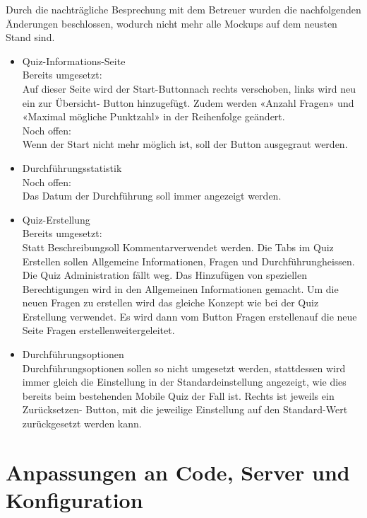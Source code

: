 \documentclass[12pt, a4paper]{report}
\begin{document}
	Durch die nachträgliche Besprechung mit dem Betreuer wurden die nachfolgenden  Änderungen beschlossen, wodurch nicht mehr alle Mockups auf dem neusten Stand sind.
	\begin{itemize}
		\item Quiz-Informations-Seite\\
		Bereits umgesetzt:\\
		Auf dieser Seite wird der \glqq Start-Button\grqq nach rechts verschoben, links wird neu ein \glqq zur Übersicht\grqq - Button hinzugefügt. Zudem werden «Anzahl Fragen» und «Maximal mögliche Punktzahl» in der Reihenfolge geändert.\\
		Noch offen:\\
		Wenn der Start nicht mehr möglich ist, soll der Button ausgegraut werden.
		\item Durchführungsstatistik\\
		Noch offen:\\
		Das Datum der Durchführung soll immer angezeigt werden.
		\item Quiz-Erstellung\\
		Bereits umgesetzt:\\
		Statt \glqq Beschreibung\grqq soll \glqq Kommentar\grqq verwendet werden. Die Tabs im Quiz Erstellen sollen \glqq Allgemeine Informationen, Fragen und Durchführung\grqq heissen. Die Quiz Administration fällt weg. Das Hinzufügen von speziellen Berechtigungen wird in den Allgemeinen Informationen gemacht. Um die neuen Fragen zu erstellen wird das gleiche Konzept wie bei der Quiz Erstellung verwendet. Es wird dann vom Button \glqq Fragen erstellen\grqq auf die neue Seite \glqq Fragen erstellen\grqq weitergeleitet.
		
		\item Durchführungsoptionen\\
		Durchführungsoptionen sollen so nicht umgesetzt werden, stattdessen wird immer gleich die Einstellung in der Standardeinstellung angezeigt, wie dies bereits beim bestehenden Mobile Quiz der Fall ist. Rechts ist jeweils ein \glqq Zurücksetzen\grqq - Button, mit die jeweilige Einstellung auf den Standard-Wert zurückgesetzt werden kann.
		
	\end{itemize}
	
	
	
	
	\chapter{Anpassungen an Code, Server und Konfiguration}
	
\end{document}
